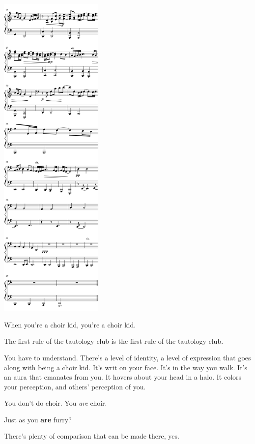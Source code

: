 \begin{paracol}{2}
\begin{rightcolumn*}
\noindent\includegraphics[width=2in]{assets/static/miniatures/5-2.png}
\end{rightcolumn*}
\begin{leftcolumn}

\noindent When you're a choir kid, you're a choir kid.

\begin{ally}
The first rule of the tautology club is the first rule of the tautology club.
\end{ally}
You have to understand. There's a level of identity, a level of expression that goes along with being a choir kid. It's writ on your face. It's in the way you walk. It's an aura that emanates from you. It hovers about your head in a halo. It colors your perception, and others' perception of you.

You don't do choir. You \emph{are} choir.

\begin{ally}
Just as you \textbf{are} furry?
\end{ally}
There's plenty of comparison that can be made there, yes.


\end{leftcolumn}
\end{paracol}
